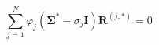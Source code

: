 \begin{equation}
    \sum_{j = 1}^N \varphi_j \left(\boldsymbol{\Sigma^*} - \sigma_j \mathbf{I}\right)\mathbf{R}^{(j,*)} = 0
\label{eq:effective_medium_theory}
\end{equation}
